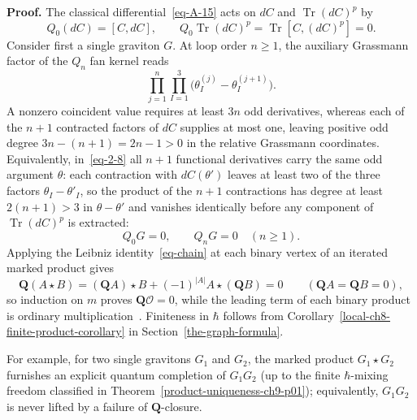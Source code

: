 \documentclass[11pt]{article}
\numberwithin{equation}{section}
\numberwithin{figure}{section}
\numberwithin{table}{section}
\begin{document}
\begin{proofbox}
\textbf{Proof.} The classical differential~\eqref{eq-A-15} acts on $dC$ and $\operatorname{Tr}(dC)^p$ by
\begin{equation}\label{eq-2-58}
Q_0(dC)=[C,dC],\qquad Q_0\operatorname{Tr}(dC)^p=\operatorname{Tr}[C,(dC)^p]=0.
\end{equation}
Consider first a single graviton $G$. At loop order $n\ge1$, the auxiliary Grassmann factor of the $Q_n$ fan kernel reads
\begin{equation}\label{eq-graviton-odd-factor}
\prod_{j=1}^{n}\prod_{I=1}^{3}
\bigl(\theta_I^{(j)}-\theta_I^{(j+1)}\bigr).
\end{equation}
A nonzero coincident value requires at least $3n$ odd derivatives, whereas each of the $n+1$ contracted factors of $dC$ supplies at most one, leaving positive odd degree $3n-(n+1)=2n-1>0$ in the relative Grassmann coordinates. Equivalently, in~\eqref{eq-2-8} all $n+1$ functional derivatives carry the same odd argument $\theta$: each contraction with $dC(\theta')$ leaves at least two of the three factors $\theta_I-\theta'_I$, so the product of the $n+1$ contractions has degree at least $2(n+1)>3$ in $\theta-\theta'$ and vanishes identically before any component of $\operatorname{Tr}(dC)^p$ is extracted:
\begin{equation}\label{eq-2-60}
Q_0G=0,\qquad Q_nG=0\quad(n\geq1).
\end{equation}
Applying the Leibniz identity~\eqref{eq-chain} at each binary vertex of an iterated marked product gives
\begin{equation}\label{b-00642}
\mathbf Q(A\star B)
=(\mathbf QA)\star B+(-1)^{|A|}A\star(\mathbf QB)=0
\qquad(\mathbf QA=\mathbf QB=0),
\end{equation}
so induction on $m$ proves $\mathbf Q\mathcal O=0$, while the leading term of each binary product is ordinary multiplication~\cite[Section 5]{ChangYin}. Finiteness in $\hbar$ follows from Corollary~\ref{local-ch8-finite-product-corollary} in Section~\ref{the-graph-formula}.~\hfill\qedsymbol
\end{proofbox}

For example, for two single gravitons $G_1$ and $G_2$, the marked product $G_1\star G_2$ furnishes an explicit quantum completion of $G_1G_2$ (up to the finite $\hbar$-mixing freedom classified in Theorem~\ref{product-uniqueness-ch9-p01}); equivalently, $G_1G_2$ is never lifted by a failure of $\mathbf Q$-closure.
\end{document}

